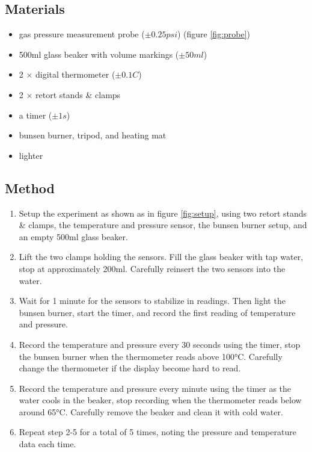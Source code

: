 \documentclass[a4paper,12pt]{article}
\begin{document}
\subsection{Materials}

\begin{itemize}
    \item gas pressure measurement probe ($\pm 0.25\si{psi}$) (figure \ref{fig:probe})
    \item 500ml glass beaker with volume markings ($\pm 50\si{ml}$)
    \item 2 $\times$ digital thermometer ($\pm 0.1\si{C}$)
    \item 2 $\times$ retort stands \& clamps
    \item a timer ($\pm 1\si{s}$)
    \item bunsen burner, tripod, and heating mat
    \item lighter
\end{itemize}

\subsection{Method}


\begin{enumerate}
    \item Setup the experiment as shown as in figure \ref{fig:setup}, using two retort stands \& clamps, the temperature and pressure sensor, the bunsen burner setup, and an empty 500ml glass beaker.
    \item Lift the two clamps holding the sensors. Fill the glass beaker with tap water, stop at approximately 200ml. Carefully reinsert the two sensors into the water.
    \item Wait for 1 minute for the sensors to stabilize in readings. Then light the bunsen burner, start the timer, and record the first reading of temperature and pressure.
    \item Record the temperature and pressure every 30 seconds using the timer, stop the bunsen burner when the thermometer reads above 100$\si{\celsius}$. Carefully change the thermometer if the display become hard to read.
    \item Record the temperature and pressure every minute using the timer as the water cools in the beaker, stop recording when the thermometer reads below around 65$\si{\celsius}$. Carefully remove the beaker and clean it with cold water.
    \item Repeat step 2-5 for a total of 5 times, noting the pressure and temperature data each time.
\end{enumerate}
\end{document}
